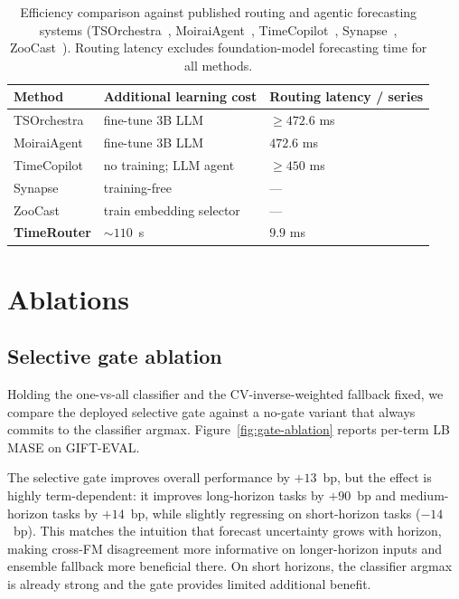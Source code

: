 \documentclass{article}
\theoremstyle{plain}
\theoremstyle{definition}
\theoremstyle{remark}
\begin{document}
\begin{table}[h]
\centering
\footnotesize
\setlength{\tabcolsep}{4pt}
\begin{tabular}{@{}p{2.0cm}p{3.4cm}p{1.7cm}@{}}
\toprule
Method & Additional learning cost & Routing latency / series \\
\midrule
TSOrchestra & fine-tune 3B LLM & $\geq472.6$ ms \\
MoiraiAgent & fine-tune 3B LLM         & $472.6$ ms \\
TimeCopilot & no training; LLM agent   & $\geq450$ ms \\
Synapse     & training-free & --- \\
ZooCast     & train embedding selector & --- \\
\midrule
\textbf{TimeRouter} & $\sim$$110$~s & $9.9$ ms  \\
\bottomrule
\end{tabular}
\vspace{2mm}
\caption{Efficiency comparison against published routing and agentic forecasting systems (TSOrchestra~\citep{tsorchestra}, MoiraiAgent~\citep{moiraiagent}, TimeCopilot~\citep{garza2025timecopilot}, Synapse~\citep{synapse}, ZooCast~\citep{zoocast}). Routing latency excludes foundation-model forecasting time for all methods. }
\label{tab:efficiency-main}
\end{table}


\section{Ablations}
\label{sec:ablations}

\subsection{Selective gate ablation}
\label{sec:gate-ablation}

Holding the one-vs-all classifier and the CV-inverse-weighted fallback fixed, we compare the deployed selective gate against a no-gate variant that always commits to the classifier argmax. Figure~\ref{fig:gate-ablation} reports per-term LB MASE on GIFT-EVAL.

The selective gate improves overall performance by $+13$~bp, but the effect is highly term-dependent: it improves long-horizon tasks by $+90$~bp and medium-horizon tasks by $+14$~bp, while slightly regressing on short-horizon tasks ($-14$~bp). This matches the intuition that forecast uncertainty grows with horizon, making cross-FM disagreement more informative on longer-horizon inputs and ensemble fallback more beneficial there. On short horizons, the classifier argmax is already strong and the gate provides limited additional benefit.
\end{document}
